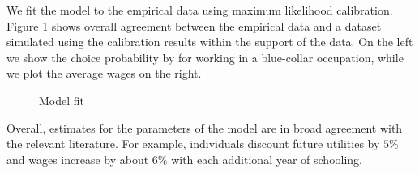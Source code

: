 \noindent We fit the model to the empirical data using maximum likelihood calibration. Figure \ref{Model fit} shows overall agreement between the empirical data and a dataset simulated using the calibration results within the support of the data. On the left we show the choice probability by for working in a blue-collar occupation, while we plot the average wages on the right.
%
\begin{figure}[h!]\centering
\caption{Model fit}\label{Model fit}
\hspace{0.3cm}
\end{figure}\FloatBarrier
%
\noindent Overall, estimates for the parameters of the model are in broad agreement with the relevant literature. For example, individuals discount future utilities by  $5\%$ and wages increase by about $6\%$ with each additional year of schooling.
